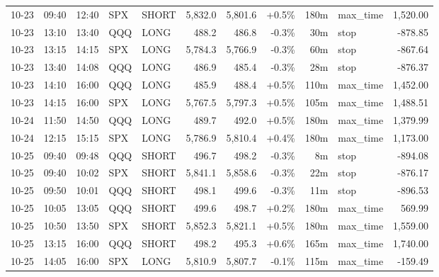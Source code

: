 \documentclass[11pt,a4paper,twoside]{article}
\begin{document}
\begin{center}
\begin{longtable}{>{\color{txtmain}}l l l l l r r r r >{\color{txtmain}}l r}
10-23 & 09:40 & 12:40 & SPX & SHORT & 5,832.0 & 5,801.6 & \textcolor{wingreen}{+0.5\%} & 180m & max\_time & \textcolor{wingreen}{1,520.00} \\
10-23 & 13:10 & 13:40 & QQQ & LONG & 488.2 & 486.8 & \textcolor{lossred}{-0.3\%} & 30m & stop & \textcolor{lossred}{-878.85} \\
10-23 & 13:15 & 14:15 & SPX & LONG & 5,784.3 & 5,766.9 & \textcolor{lossred}{-0.3\%} & 60m & stop & \textcolor{lossred}{-867.64} \\
10-23 & 13:40 & 14:08 & QQQ & LONG & 486.9 & 485.4 & \textcolor{lossred}{-0.3\%} & 28m & stop & \textcolor{lossred}{-876.37} \\
10-23 & 14:10 & 16:00 & QQQ & LONG & 485.9 & 488.4 & \textcolor{wingreen}{+0.5\%} & 110m & max\_time & \textcolor{wingreen}{1,452.00} \\
10-23 & 14:15 & 16:00 & SPX & LONG & 5,767.5 & 5,797.3 & \textcolor{wingreen}{+0.5\%} & 105m & max\_time & \textcolor{wingreen}{1,488.51} \\
10-24 & 11:50 & 14:50 & QQQ & LONG & 489.7 & 492.0 & \textcolor{wingreen}{+0.5\%} & 180m & max\_time & \textcolor{wingreen}{1,379.99} \\
10-24 & 12:15 & 15:15 & SPX & LONG & 5,786.9 & 5,810.4 & \textcolor{wingreen}{+0.4\%} & 180m & max\_time & \textcolor{wingreen}{1,173.00} \\
10-25 & 09:40 & 09:48 & QQQ & SHORT & 496.7 & 498.2 & \textcolor{lossred}{-0.3\%} & 8m & stop & \textcolor{lossred}{-894.08} \\
10-25 & 09:40 & 10:02 & SPX & SHORT & 5,841.1 & 5,858.6 & \textcolor{lossred}{-0.3\%} & 22m & stop & \textcolor{lossred}{-876.17} \\
10-25 & 09:50 & 10:01 & QQQ & SHORT & 498.1 & 499.6 & \textcolor{lossred}{-0.3\%} & 11m & stop & \textcolor{lossred}{-896.53} \\
10-25 & 10:05 & 13:05 & QQQ & SHORT & 499.6 & 498.7 & \textcolor{wingreen}{+0.2\%} & 180m & max\_time & \textcolor{wingreen}{569.99} \\
10-25 & 10:50 & 13:50 & SPX & SHORT & 5,852.3 & 5,821.1 & \textcolor{wingreen}{+0.5\%} & 180m & max\_time & \textcolor{wingreen}{1,559.00} \\
10-25 & 13:15 & 16:00 & QQQ & SHORT & 498.2 & 495.3 & \textcolor{wingreen}{+0.6\%} & 165m & max\_time & \textcolor{wingreen}{1,740.00} \\
10-25 & 14:05 & 16:00 & SPX & LONG & 5,810.9 & 5,807.7 & \textcolor{lossred}{-0.1\%} & 115m & max\_time & \textcolor{lossred}{-159.49} \\

\end{longtable}
\end{center}
\end{document}
